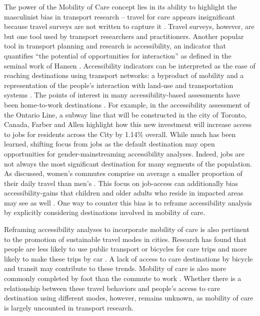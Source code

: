\documentclass[
  authoryear,
  preprint,
  3p]{elsarticle}
\begin{document}
The power of the Mobility of Care concept lies in its ability to
highlight the masculinist bias in transport research -- travel for care
appears insignificant because travel surveys are not written to capture
it \citep{sanchezdemadariagaMobilityCareIntroducing2013}. Travel
surveys, however, are but one tool used by transport researchers and
practitioners. Another popular tool in transport planning and research
is accessibility, an indicator that quantifies ``the potential of
opportunities for interaction'' as defined in the seminal work of Hansen
\citep{hansenHowAccessibilityShapes1959}. Accessibility indicators can
be interpreted as the ease of reaching destinations using transport
networks: a byproduct of mobility and a representation of the people's
interaction with land-use and transportation systems
\citep{hansenHowAccessibilityShapes1959, handyAccessibilityIdeaWhose2020, elgeneidyMakingAccessibilityWork2021}.
The points of interest in many accessibility-based assessments have been
home-to-work destinations
\citep{kelobonyeRelativeAccessibilityAnalysis2019, farberOntarioLineSocioeconomic2019, duarteInfluenceJobAccessibility2023, ryanAccessibilitySpaceTime2023}.
For example, in the accessibility assessment of the Ontario Line, a
subway line that will be constructed in the city of Toronto, Canada,
Farber and Allen \citep{farberOntarioLineSocioeconomic2019} highlight
how this new investment will increase access to jobs for residents
across the City by 1.14\% overall. While much has been learned, shifting
focus from jobs as the default destination may open opportunities for
gender-mainstreaming accessibility analyses. Indeed, jobs are not always
the most significant destination for many segments of the population. As
discussed, women's commutes comprise on average a smaller proportion of
their daily travel than men's
\citep{ravensbergenExploratoryAnalysisMobility2022}. This focus on
job-access can additionally bias accessibility-gains that children and
older adults who reside in impacted areas may see as well
\citep{grantsmithManagingChallengesCombining2016}. One way to counter
this bias is to reframe accessibility analysis by explicitly considering
destinations involved in mobility of care.

Reframing accessibility analyses to incorporate mobility of care is also
pertinent to the promotion of sustainable travel modes in cities.
Research has found that people are less likely to use public transport
or bicycles for care trips
\citep{ravensbergenExploratoryAnalysisMobility2022} and more likely to
make these trips by car
\citep{maciejewskaHaveChildrenThus2019, ravensbergenExploratoryAnalysisMobility2022}.
A lack of access to care destinations by bicycle and transit may
contribute to these trends. Mobility of care is also more commonly
completed by foot than the commute to work
\citep{ravensbergenExploratoryAnalysisMobility2022}. Whether there is a
relationship between these travel behaviors and people's access to care
destination using different modes, however, remains unknown, as mobility
of care is largely uncounted in transport research.
\end{document}
